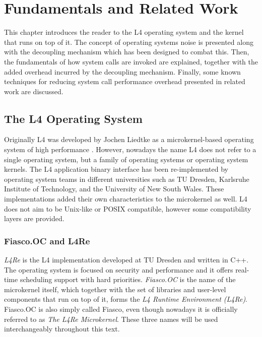 \chapter{Fundamentals and Related Work}
\label{chap:fundamentals}

This chapter introduces the reader to the L4 operating system and the \llinux
kernel that runs on top of it. The concept of operating systems noise is
presented along with the \llinux decoupling mechanism which has been designed
to combat this. Then, the fundamentals of how system calls are invoked are
explained, together with the added overhead incurred by the decoupling
mechanism. Finally, some known techniques for reducing system call performance
overhead presented in related work are discussed.

\section{The L4 Operating System}

Originally L4 was developed by Jochen Liedtke as a microkernel-based operating
system of high performance \cite{l4}\cite{l4_performance}. However, nowadays
the name L4 does not refer to a single operating system, but a family of
operating systems or operating system kernels. The L4 application binary
interface has been re-implemented by operating system teams in different
universities such as TU Dresden, Karlsruhe Institute of Technology, and the
University of New South Wales. These implementations added their own
characteristics to the microkernel as well. L4 does not aim to be Unix-like or
POSIX compatible, however some compatibility layers are provided.

\subsection{Fiasco.OC and L4Re}

\emph{L4Re} is the L4 implementation developed at TU Dresden and written in
C++. The operating system is focused on security and performance and it offers
real-time scheduling support with hard priorities. \emph{Fiasco.OC}
\cite{fiasco} is the name of the microkernel itself, which together with the
set of libraries and user-level components that run on top of it, forms the
\emph{L4 Runtime Environment (L4Re)}. Fiasco.OC is also simply called Fiasco,
even though nowadays it is officially referred to as \emph{The L4Re
Microkernel}. These three names will be used interchangeably throughout this
text.

